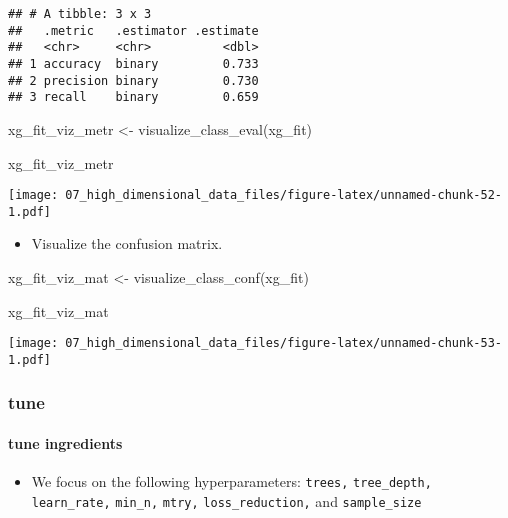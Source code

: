 \documentclass[
]{book}
\newenvironment{Shaded}{\begin{snugshade}}{\end{snugshade}}
\newcommand{\FunctionTok}[1]{\textcolor[rgb]{0.00,0.00,0.00}{#1}}
\newcommand{\NormalTok}[1]{#1}
\newcommand{\OtherTok}[1]{\textcolor[rgb]{0.56,0.35,0.01}{#1}}
\providecommand{\tightlist}{%
  \setlength{\itemsep}{0pt}\setlength{\parskip}{0pt}}
\begin{document}
\begin{verbatim}
## # A tibble: 3 x 3
##   .metric   .estimator .estimate
##   <chr>     <chr>          <dbl>
## 1 accuracy  binary         0.733
## 2 precision binary         0.730
## 3 recall    binary         0.659
\end{verbatim}

\begin{Shaded}
\begin{Highlighting}[]
\NormalTok{xg\_fit\_viz\_metr }\OtherTok{\textless{}{-}} \FunctionTok{visualize\_class\_eval}\NormalTok{(xg\_fit)}

\NormalTok{xg\_fit\_viz\_metr}
\end{Highlighting}
\end{Shaded}

\texttt{[image: 07\_high\_dimensional\_data\_files/figure-latex/unnamed-chunk-52-1.pdf]}

\begin{itemize}
\tightlist
\item
  Visualize the confusion matrix.
\end{itemize}

\begin{Shaded}
\begin{Highlighting}[]
\NormalTok{xg\_fit\_viz\_mat }\OtherTok{\textless{}{-}} \FunctionTok{visualize\_class\_conf}\NormalTok{(xg\_fit)}

\NormalTok{xg\_fit\_viz\_mat}
\end{Highlighting}
\end{Shaded}

\texttt{[image: 07\_high\_dimensional\_data\_files/figure-latex/unnamed-chunk-53-1.pdf]}

\hypertarget{tune-3}{%
\subsubsection{tune}\label{tune-3}}

\hypertarget{tune-ingredients-3}{%
\paragraph{tune ingredients}\label{tune-ingredients-3}}

\begin{itemize}
\tightlist
\item
  We focus on the following hyperparameters: \texttt{trees,} \texttt{tree\_depth,} \texttt{learn\_rate,} \texttt{min\_n,} \texttt{mtry,} \texttt{loss\_reduction,} and \texttt{sample\_size}
\end{itemize}
\end{document}
